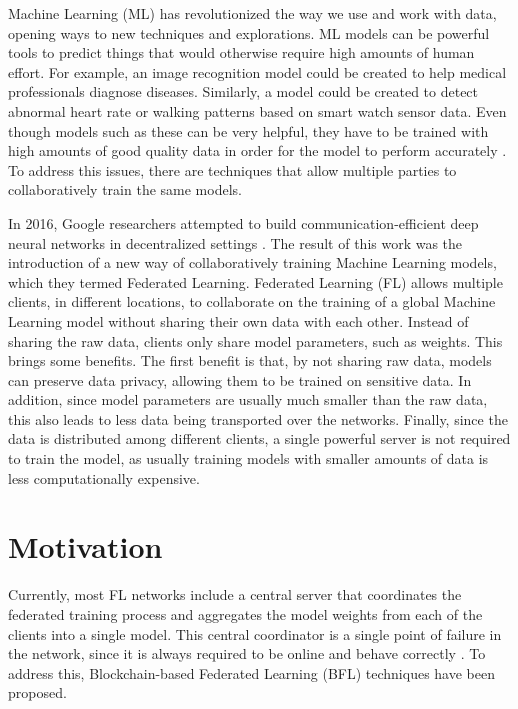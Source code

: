 Machine Learning (ML) has revolutionized the way we use and work with data, opening ways to new techniques and explorations. ML models can be powerful tools to predict things that would otherwise require high amounts of human effort. For example, an image recognition model could be created to help medical professionals diagnose diseases. Similarly, a model could be created to detect abnormal heart rate or walking patterns based on smart watch sensor data. Even though models such as these can be very helpful, they have to be trained with high amounts of good quality data in order for the model to perform accurately \cite{10.1145/3394486.3406477}. To address this issues, there are techniques that allow multiple parties to collaboratively train the same models.

In 2016, Google researchers attempted to build communication-efficient deep neural networks in decentralized settings \cite{10.48550/arxiv.1602.05629}. The result of this work was the introduction of a new way of collaboratively training Machine Learning models, which they termed Federated Learning. Federated Learning (FL) allows multiple clients, in different locations, to collaborate on the training of a global Machine Learning model without sharing their own data with each other. Instead of sharing the raw data, clients only share model parameters, such as weights. This brings some benefits. The first benefit is that, by not sharing raw data, models can preserve data privacy, allowing them to be trained on sensitive data. In addition, since model parameters are usually much smaller than the raw data, this also leads to less data being transported over the networks. Finally, since the data is distributed among different clients, a single powerful server is not required to train the model, as usually training models with smaller amounts of data is less computationally expensive.

\section{Motivation}\label{intro:motivation}

Currently, most FL networks include a central server that coordinates the federated training process and aggregates the model weights from each of the clients into a single model. This central coordinator is a single point of failure in the network, since it is always required to be online and behave correctly \cite{li_blockchain_2021, 10.48550/arxiv.2110.02182}. To address this, Blockchain-based Federated Learning (BFL) techniques have been proposed.

